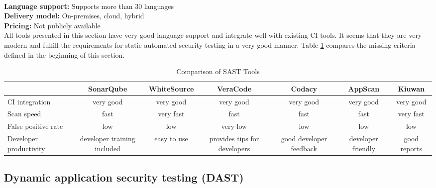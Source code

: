 \documentclass[conference]{IEEEtran}
\begin{document}
\noindent\\
\textbf{Language support:} Supports more than 30 languages
\noindent\\
\textbf{Delivery model:} On-premises, cloud, hybrid
\noindent\\
\textbf{Pricing:} Not publicly available
\\

All tools presented in this section have very good language support and integrate well with existing CI tools. It seems that they are very modern and fulfill the requirements for static automated security testing in a very good manner. Table \ref{table:comparison_sast} compares the missing criteria defined in the beginning of this section.

\begin{table}[h]
	\centering
	\scriptsize
	\caption{Comparison of SAST Tools}
	\begin{tabular}{l | c | c | c | c | c | c}
		\toprule
		\textbf{} & \textbf{SonarQube}& \textbf{WhiteSource} & \textbf{VeraCode} & \textbf{Codacy} & \textbf{AppScan} & \textbf{Kiuwan}\\
		\hline
		\rowcolor[gray]{.9} CI integration    & very good & very good & very good & very good & very good & very good\\
		Scan speed   & fast & very fast  & fast & fast & fast & very fast \\
		\rowcolor[gray]{.9}  False positive rate & low & low  & very low & low & low & low  \\
		Developer productivity  &  developer training included & easy to use & provides tips for developers & good developer feedback & developer friendly & good reports \\

		\bottomrule
	\end{tabular}
	\label{table:comparison_sast}
\end{table}



\newpage
\noindent
\subsection{Dynamic application security testing (DAST)}
\end{document}

